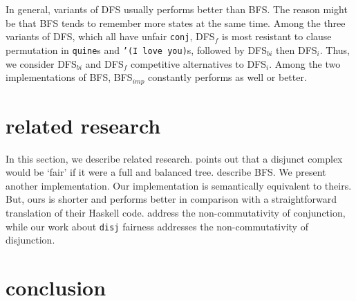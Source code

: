 \documentclass[acmlarge]{acmart}
\newcommand{\conj}{\texttt{conj}}
\newcommand{\disj}{\texttt{disj}}
\newcommand{\appendo}{\texttt{append$^o$}}
\newcommand{\reverso}{\texttt{revers$^o$}}
\newcommand{\DFSi }[0]{DFS$_{i}$}
\newcommand{\DFSf }[0]{DFS$_{f}$}
\newcommand{\DFSbi}[0]{DFS$_{bi}$}
\newcommand{\BFS}[0]{BFS}
\newcommand{\BFSimp}[0]{BFS$_{imp}$}
\begin{document}

In general, variants of DFS usually performs better than BFS. The reason might 
be that \BFS{} tends to remember more states at the same time. Among the three 
variants of DFS, which all have unfair \conj{}, \DFSf{} is most resistant to 
clause permutation in \texttt{quine}s and \texttt{'(I love you)}s, followed by 
\DFSbi{} then \DFSi{}. Thus, we consider \DFSbi{} and \DFSf{} competitive 
alternatives to \DFSi{}. Among the two implementations of \BFS, \BFSimp{} 
constantly performs as well or better.

\section{related research}

In this section, we describe related research. 
\citet{yang2010adventures} points 
out that a disjunct complex would be `fair' if it were a full and balanced tree.
\citet{seres1999algebra} describe BFS. We present another implementation. Our 
implementation is semantically 
equivalent to theirs. But, ours is shorter and performs better in comparison 
with a straightforward translation of their Haskell code.
\citet{rozplokhas2018improving} address the non-commutativity of conjunction, 
while our work about \disj{} fairness addresses the non-commutativity of 
disjunction.

\section{conclusion}

\end{document}
